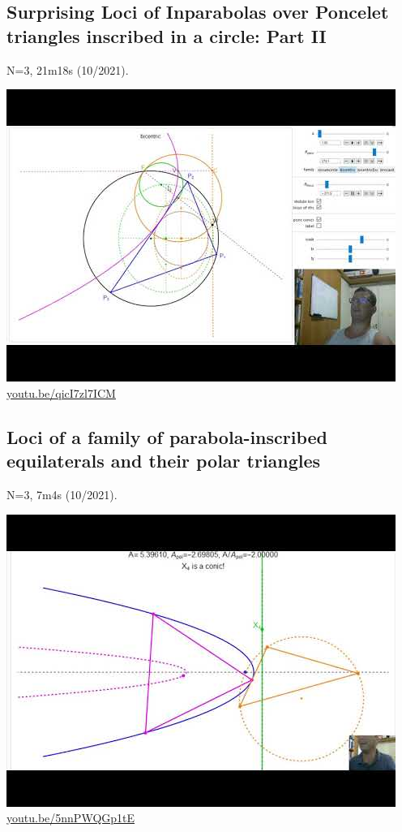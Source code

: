 \documentclass[12pt]{amsart}
\begin{document}
\subsection{Surprising Loci of Inparabolas over Poncelet triangles inscribed in a circle: Part II}
\label{vid:qicI7zl7ICM}
\noindent N=3, 21m18s (10/2021). 
\begin{center}\includegraphics[width=.5\textwidth]{pics/qicI7zl7ICM.jpg} \\ 
\href{https://youtu.be/qicI7zl7ICM}{\url{youtu.be/qicI7zl7ICM}}\end{center}
% 

\subsection{Loci of a family of parabola-inscribed equilaterals and their polar triangles}
\label{vid:5nnPWQGp1tE}
\noindent N=3, 7m4s (10/2021). 
\begin{center}\includegraphics[width=.5\textwidth]{pics/5nnPWQGp1tE.jpg} \\ 
\href{https://youtu.be/5nnPWQGp1tE}{\url{youtu.be/5nnPWQGp1tE}}\end{center}
% 
\end{document}
